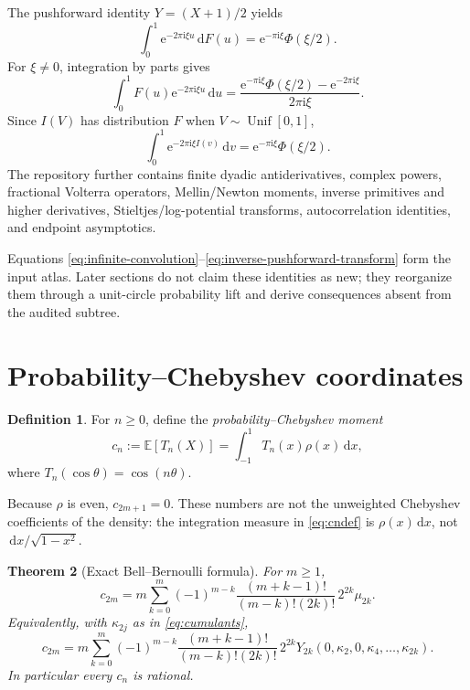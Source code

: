 \documentclass[11pt,oneside]{article}
\newtheorem{theorem}{Theorem}[section]
\theoremstyle{definition}
\newtheorem{definition}[theorem]{Definition}
\newcommand{\dd}{\,\mathrm d}
\newcommand{\ee}{\mathrm e}
\newcommand{\ii}{\mathrm i}
\newcommand{\E}{\mathbb E}
\begin{document}
The pushforward identity \(Y=(X+1)/2\) yields
\begin{equation}
 \int_0^1\ee^{-2\pi\ii\xi u}\dd F(u)
 =\ee^{-\pi\ii\xi}\Phi(\xi/2).
 \label{eq:F-measure-transform}
\end{equation}
For \(\xi\ne0\), integration by parts gives
\begin{equation}
 \int_0^1F(u)\ee^{-2\pi\ii\xi u}\dd u
 =\frac{\ee^{-\pi\ii\xi}\Phi(\xi/2)-\ee^{-2\pi\ii\xi}}
 {2\pi\ii\xi}.
 \label{eq:F-function-transform}
\end{equation}
Since \(I(V)\) has distribution \(F\) when \(V\sim\operatorname{Unif}[0,1]\),
\begin{equation}
 \int_0^1\ee^{-2\pi\ii\xi I(v)}\dd v
 =\ee^{-\pi\ii\xi}\Phi(\xi/2).
 \label{eq:inverse-pushforward-transform}
\end{equation}
The repository further contains finite dyadic antiderivatives, complex powers, fractional
Volterra operators, Mellin/Newton moments, inverse primitives and higher derivatives,
Stieltjes/log-potential transforms, autocorrelation identities, and endpoint asymptotics.

\begin{baselinebox}
Equations \eqref{eq:infinite-convolution}--\eqref{eq:inverse-pushforward-transform} form the
input atlas. Later sections do not claim these identities as new; they reorganize them
through a unit-circle probability lift and derive consequences absent from the audited
subtree.
\end{baselinebox}

\section{Probability--Chebyshev coordinates}
\label{sec:cheb}

\begin{definition}
For \(n\ge0\), define the \emph{probability--Chebyshev moment}
\begin{equation}
 c_n:=\E[T_n(X)]=\int_{-1}^{1}T_n(x)\rho(x)\dd x,
 \label{eq:cndef}
\end{equation}
where \(T_n(\cos\theta)=\cos(n\theta)\).
\end{definition}

Because \(\rho\) is even, \(c_{2m+1}=0\). These numbers are not the unweighted Chebyshev
coefficients of the density: the integration measure in \eqref{eq:cndef} is
\(\rho(x)\dd x\), not \(\dd x/\sqrt{1-x^2}\).

\begin{theorem}[Exact Bell--Bernoulli formula]
\label{thm:c-exact}
For \(m\ge1\),
\begin{equation}
 c_{2m}=m\sum_{k=0}^{m}(-1)^{m-k}
 \frac{(m+k-1)!}{(m-k)!(2k)!}\,2^{2k}\mu_{2k}.
 \label{eq:c-moment-formula}
\end{equation}
Equivalently, with \(\kappa_{2j}\) as in \eqref{eq:cumulants},
\begin{equation}
 c_{2m}=m\sum_{k=0}^{m}(-1)^{m-k}
 \frac{(m+k-1)!}{(m-k)!(2k)!}\,2^{2k}
 Y_{2k}(0,\kappa_2,0,\kappa_4,\ldots,\kappa_{2k}).
 \label{eq:c-Bell-Bernoulli}
\end{equation}
In particular every \(c_n\) is rational.
\end{theorem}
\end{document}
